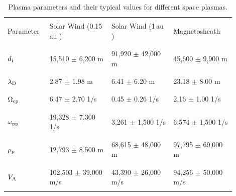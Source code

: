         \begin{table}[ht]
            \centering
            \caption[Plasma Parameters - Median values]{Plasma parameters and their typical values for different space plasmas.\protect\footnotemark}
            \begin{tabular}{ p{0.15\linewidth}  p{0.25\linewidth}  p{0.25\linewidth}
            p{0.25\linewidth}  }
                \hline
                \\
                Parameter & Solar Wind (0.15\,au ) & Solar Wind (1\,au ) & Magnetosheath \\ \\
                \hline
                \\
                $d_{\rm i}$ & 15,510 $\pm$ 6,200 m & 91,920 $\pm$ 42,000 m & 45,600 $\pm$ 9,900 m\\
                \\
                \\
                $\lambda_{\rm D}$ & 2.87 $\pm$ 1.98 m & 6.41 $\pm$ 6.20 m & 23.18 $\pm$ 8.00 m\\ \\
                \\
                $\Omega_{\rm cp}$ & 6.47 $\pm$ 2.70 1/s & 0.45 $\pm$ 0.26 1/s & 2.16 $\pm$ 1.00
                1/s\\ \\
                \\
                $\omega_{\rm pp}$ & 19,328 $\pm$ 7,300 1/s & 3,261 $\pm$ 1,500 1/s & 6,574 $\pm$
                1,500 1/s\\ \\
                \\
                $\rho_{\rm p}$ & 12,793 $\pm$ 8,500 m & 68,615 $\pm$ 48,000 m & 97,795 $\pm$ 69,000
                m\\ \\
                \\
                $V_{\rm A}$ & 102,503 $\pm$ 39,000 m/s & 43,390 $\pm$ 26,000 m/s & 94,256 $\pm$
                50,000 m/s\\ \\
                \hline
            \end{tabular}
            \label{tab:plaspar1}
        \end{table}

